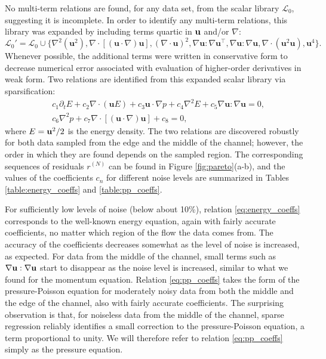 \documentclass[preprint]{article}
\def\bi#1{\textbf{#1}}
\begin{document}
No multi-term relations are found, for any data set, from the scalar library $\mathcal{L}_0$, suggesting it is incomplete. In order to identify any multi-term relations, this library was expanded by including %
terms quartic in ${\bf u}$ and/or $\nabla$:
\begin{equation}
    \mathcal{L}_0'=\mathcal{L}_0\cup\{\nabla^2 ({\bi u}^2),\nabla \cdot \left[ ({\bi u} \cdot \nabla) {\bi u} \right],(\nabla \cdot {\bi u})^2,\nabla {\bi u}: \nabla {\bi u}^\top,\nabla {\bi u}:\nabla {\bi u},\nabla \cdot( {\bi u}^2{\bi u}),{\bi u}^4\}.
    \label{eq:augment_rank0}
\end{equation}
Whenever possible, the additional terms were written in conservative form to decrease numerical error associated with evaluation of higher-order derivatives in weak form. Two relations are identified from this expanded scalar library via sparsification:
\begin{align}
    & c_1 \partial_t E + c_2 \nabla \cdot({\bi u}E) + c_3 {\bi u} \cdot \nabla p + c_4\nabla^2E +c_5 \nabla {\bi u} : \nabla {\bi u} = 0 \label{eq:energy_coeffs},\\
 & c_6\nabla^2 p + c_7\nabla \cdot[({\bi u} \cdot \nabla) {\bi u}] +c_8 = 0, \label{eq:pp_coeffs}
\end{align}
where $E={\bf u}^2/2$ is the energy density.
The two relations are discovered robustly for both data sampled from the edge and the middle of the channel; however, the order in which they are found depends on the sampled region.
The corresponding sequences of residuals $r^{(N)}$ can be found in Figure \ref{fig:pareto}(a-b), and the values of the coefficients $c_n$ for different noise levels are summarized in Tables \ref{table:energy_coeffs} and \ref{table:pp_coeffs}. 

For sufficiently low levels of noise (below about 10\%), relation \eqref{eq:energy_coeffs} corresponds to the well-known energy equation, again with fairly accurate coefficients, no matter which region of the flow the data comes from. The accuracy of the coefficients decreases somewhat as the level of noise is increased, as expected. For data from the middle of the channel, small terms such as $\nabla{\bf u}:\nabla{\bf u}$ start to disappear as the noise level is increased, similar to what we found for the momentum equation.   
Relation \eqref{eq:pp_coeffs} takes the form of the pressure-Poisson equation for moderately noisy data from both the middle and the edge of the channel, also with fairly accurate coefficients. The surprising observation is that, for noiseless data from the middle of the channel, sparse regression reliably identifies a small correction to the pressure-Poisson equation, a term proportional to unity. We will therefore refer to relation \eqref{eq:pp_coeffs} simply as the pressure equation.
\end{document}
